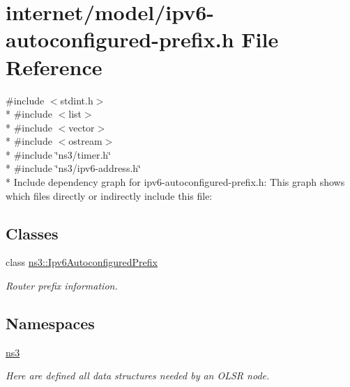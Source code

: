\hypertarget{ipv6-autoconfigured-prefix_8h}{}\section{internet/model/ipv6-\/autoconfigured-\/prefix.h File Reference}
\label{ipv6-autoconfigured-prefix_8h}
{\ttfamily \#include $<$stdint.\+h$>$}\\*
{\ttfamily \#include $<$list$>$}\\*
{\ttfamily \#include $<$vector$>$}\\*
{\ttfamily \#include $<$ostream$>$}\\*
{\ttfamily \#include \char`\"{}ns3/timer.\+h\char`\"{}}\\*
{\ttfamily \#include \char`\"{}ns3/ipv6-\/address.\+h\char`\"{}}\\*
Include dependency graph for ipv6-\/autoconfigured-\/prefix.h\+:
This graph shows which files directly or indirectly include this file\+:
\subsection*{Classes}
\begin{DoxyCompactItemize}
\item 
class \hyperlink{classns3_1_1Ipv6AutoconfiguredPrefix}{ns3\+::\+Ipv6\+Autoconfigured\+Prefix}
\begin{DoxyCompactList}\small\item\em Router prefix information. \end{DoxyCompactList}\end{DoxyCompactItemize}
\subsection*{Namespaces}
\begin{DoxyCompactItemize}
\item 
 \hyperlink{namespacens3}{ns3}
\begin{DoxyCompactList}\small\item\em Here are defined all data structures needed by an O\+L\+SR node. \end{DoxyCompactList}\end{DoxyCompactItemize}
